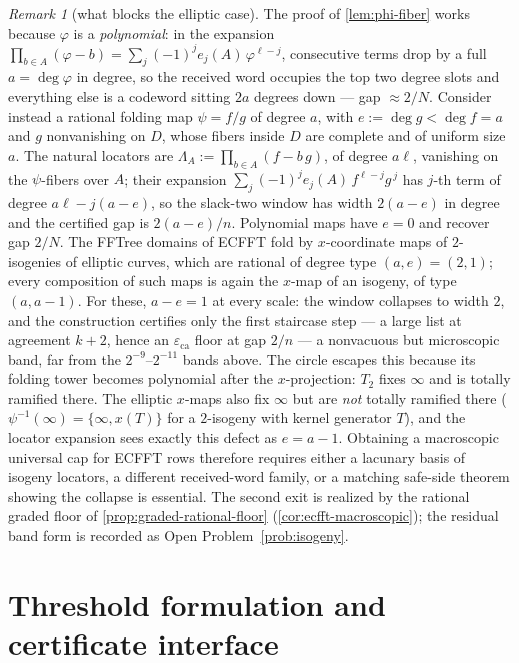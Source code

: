 \documentclass[11pt]{article}
\theoremstyle{definition}
\theoremstyle{remark}
\newtheorem{remark}[theorem]{Remark}
\newcommand{\eca}{\varepsilon_{\mathrm{ca}}}
\begin{document}
\begin{remark}[what blocks the elliptic case]\label{rem:ecfft-obstruction}
The proof of \cref{lem:phi-fiber} works because $\varphi$ is a \emph{polynomial}: in the expansion $\prod_{b\in A}(\varphi-b)=\sum_j(-1)^je_j(A)\,\varphi^{\ell-j}$, consecutive terms drop by a full $a=\deg\varphi$ in degree, so the received word occupies the top two degree slots and everything else is a codeword sitting $2a$ degrees down --- gap $\approx2/N$. Consider instead a rational folding map $\psi=f/g$ of degree $a$, with $e:=\deg g<\deg f=a$ and $g$ nonvanishing on $D$, whose fibers inside $D$ are complete and of uniform size $a$. The natural locators are $\Lambda_A:=\prod_{b\in A}(f-b\,g)$, of degree $a\ell$, vanishing on the $\psi$-fibers over $A$; their expansion $\sum_j(-1)^je_j(A)\,f^{\ell-j}g^{\,j}$ has $j$-th term of degree $a\ell-j(a-e)$, so the slack-two window has width $2(a-e)$ in degree and the certified gap is $2(a-e)/n$. Polynomial maps have $e=0$ and recover gap $2/N$. The FFTree domains of ECFFT \cite{BCKL21} fold by $x$-coordinate maps of $2$-isogenies of elliptic curves, which are rational of degree type $(a,e)=(2,1)$; every composition of such maps is again the $x$-map of an isogeny, of type $(a,a-1)$. For these, $a-e=1$ at every scale: the window collapses to width $2$, and the construction certifies only the first staircase step --- a large list at agreement $k+2$, hence an $\eca$ floor at gap $2/n$ --- a nonvacuous but microscopic band, far from the $2^{-9}$--$2^{-11}$ bands above. The circle escapes this because its folding tower becomes polynomial after the $x$-projection: $T_2$ fixes $\infty$ and is totally ramified there. The elliptic $x$-maps also fix $\infty$ but are \emph{not} totally ramified there ($\psi^{-1}(\infty)=\{\infty,x(T)\}$ for a $2$-isogeny with kernel generator $T$), and the locator expansion sees exactly this defect as $e=a-1$. Obtaining a macroscopic universal cap for ECFFT rows therefore requires either a lacunary basis of isogeny locators, a different received-word family, or a matching safe-side theorem showing the collapse is essential. The second exit is realized by the rational graded floor of \cref{prop:graded-rational-floor} \textup(\cref{cor:ecfft-macroscopic}\textup); the residual band form is recorded as Open Problem~\ref{prob:isogeny}.
\end{remark}


\section{Threshold formulation and certificate interface}\label{sec:prize-program}
\end{document}
